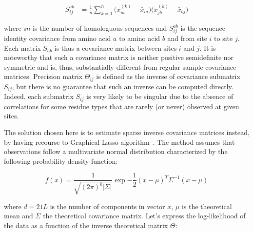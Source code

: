         \begin{equation}
            \begin{split}
                S_{ij}^{ab} & = \frac{1}{n} \sum\limits_{k=1}^{n} \big( x_{ia}^{(k)} - \bar{x}_{ia} \big) \big( x_{jb}^{(k)} - \bar{x}_{bj} \big)
            \end{split}
        \end{equation}

        where s$n$ is the number of
        homologuous sequences and $S_{ij}^{ab}$ is the sequence identity covariance from amino acid $a$ to amino acid $b$ and from site $i$ to site $j$.
        Each matrix $S_{ab}$ is thus a covariance matrix between sites $i$ and $j$. It is noteworthy that such a covariance matrix is neither positive
        semidefinite nor symmetric and is, thus, substantially different from regular sample covariance matrices. Precision matrix $\Theta_{ij}$ is defined as
        the inverse of covariance submatrix $S_{ij}$, but there is no guarantee that such an inverse can be computed directly. Indeed, each submatrix
        $S_{ij}$ is very likely to be singular due to the absence of correlations for some residue types that are rarely (or never) observed at given sites.


        The solution chosen here is to estimate sparse inverse covariance matrices instead,
        by having recourse to Graphical Lasso algorithm~\cite{graphicalLasso}.
        The method assumes that observations follow a multivariate normal distribution
        characterized by the following probability density function:

        \begin{equation}
            f(x) = \frac{1}{\sqrt{(2\pi)^k \vert\Sigma\vert}} \exp{-\frac{1}{2} (x - \mu)^T \Sigma^{-1} (x - \mu)}
        \end{equation}

        where $d=21L$ is the number of components in vector $x$, $\mu$ is the theoretical mean and $\Sigma$ the theoretical covariance matrix.
        Let's express the log-likelihood of the data as a function of the inverse theoretical matrix $\Theta$:

